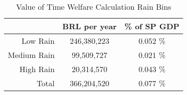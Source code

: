 \captionsetup{labelsep=newline}
\begin{table}[!htbp]
\centering

\caption{Value of Time Welfare Calculation \newline Rain Bins}
\label{table:VOT-rain}

 \begin{tabular}{r c c}
    \hline
    \hline
     & BRL per year & \% of SP GDP\\
     \hline
     Low Rain & 246,380,223 & 0.052 \%\\ 
     Medium Rain & 99,509,727 & 0.021 \% \\
     High Rain & 20,314,570 & 0.043 \% \\
     \hline
     Total & 366,204,520 & 0.077 \% \\
     \hline
     \hline
     \end{tabular}
     
\end{table}

